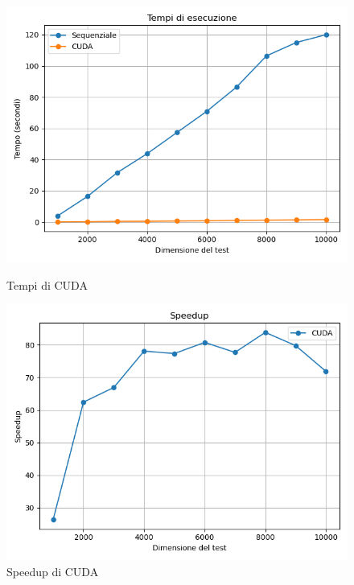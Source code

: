 \documentclass[11pt]{article}
\begin{document}
    \begin{figure}[H]
        \centering
        \begin{minipage}{0.49\textwidth}
            \centering
            \includegraphics[width=\textwidth]{plots/512/cuda_times}
            \caption{Tempi di CUDA}\label{fig:times-512-cuda}
        \end{minipage}
        \begin{minipage}{0.49\textwidth}
            \centering
            \includegraphics[width=\textwidth]{plots/512/cuda_speedup}
            \caption{Speedup di CUDA}\label{fig:speedup-512-cuda}
        \end{minipage}
    \end{figure}
\end{document}
